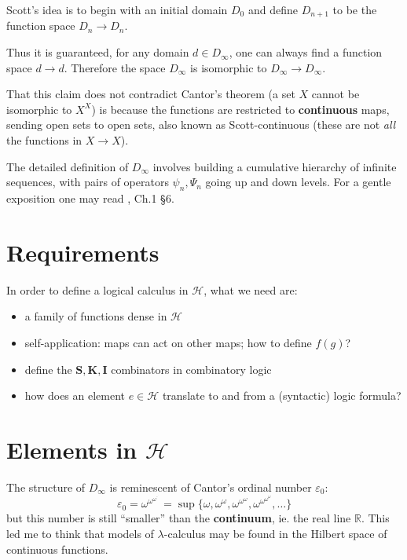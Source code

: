 Scott's idea is to begin with an initial domain $D_0$ and define $D_{n+1}$ to be the function space $D_n \rightarrow D_n$.

Thus it is guaranteed, for any domain $d \in D_{\infty}$, one can always find a function space $d \rightarrow d$.  Therefore the space $D_{\infty}$ is isomorphic to $ D_{\infty} \rightarrow D_{\infty}$.

That this claim does not contradict Cantor's theorem (a set $X$ cannot be isomorphic to $X^X$) is because the functions are restricted to \textbf{continuous} maps, sending open sets to open sets, also known as Scott-continuous (these are not \textit{all} the functions in $X \rightarrow X$).

The detailed definition of $D_{\infty}$ involves building a cumulative hierarchy of infinite sequences, with pairs of operators $\psi_n, \Psi_n$ going up and down levels.  For a gentle exposition one may read \parencite{Stenlund1972}, Ch.1 \S6.

\section{Requirements}

In order to define a logical calculus in $\mathcal{H}$, what we need are:
\begin{itemize}
	\item a family of functions dense in $\mathcal{H}$
	\item self-application:  maps can act on other maps; how to define $f(g)$?
	\item define the $\mathbf{S}, \mathbf{K}, \mathbf{I}$ combinators in combinatory logic
 	\item how does an element $e \in \mathcal{H}$ translate to and from a (syntactic) logic formula?
\end{itemize}

\section{Elements in $\mathcal{H}$}

The structure of $D_{\infty}$ is reminescent of Cantor's ordinal number $\varepsilon_0$:
\begin{equation}
{\displaystyle \varepsilon _{0}=\omega ^{\omega ^{\omega ^{\cdot ^{\cdot ^{\cdot }}}}}=\sup\{\omega ,\omega ^{\omega },\omega ^{\omega ^{\omega }},\omega ^{\omega ^{\omega ^{\omega }}},\dots \}}
\end{equation}
but this number is still ``smaller'' than the \textbf{continuum}, ie. the real line $\mathbb{R}$.  This led me to think that models of $\lambda$-calculus may be found in the Hilbert space of continuous functions.

